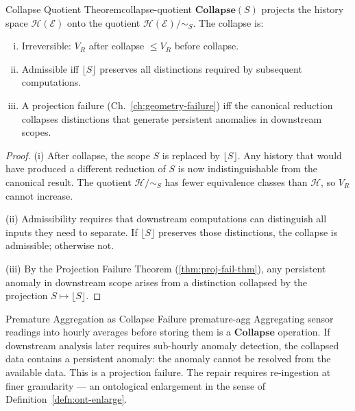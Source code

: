 \documentclass[12pt,twoside,openright]{book}
\newcommand{\csicon} {\marginpar{\tiny\color{DistBlue}\faCode}}
\newcommand{\hist}{\mathcal{H}}
\begin{document}
\begin{theorem}{Collapse Quotient Theorem}{collapse-quotient}
  $\mathbf{Collapse}(S)$ projects the history space
  $\hist(\mathcal{E})$ onto the quotient
  $\hist(\mathcal{E})/{\sim_S}$.
  The collapse is:
  \begin{enumerate}[(i)]
    \item Irreversible: $V_R$ after collapse
          $\le V_R$ before collapse.
    \item Admissible iff $\lfloor S \rfloor$ preserves
          all distinctions required by subsequent
          computations.
    \item A projection failure (Ch.~\ref{ch:geometry-failure})
          iff the canonical reduction collapses
          distinctions that generate persistent anomalies
          in downstream scopes.
  \end{enumerate}
\end{theorem}

\begin{proof}
  (i) After collapse, the scope $S$ is replaced by
  $\lfloor S \rfloor$. Any history that would have
  produced a different reduction of $S$ is now
  indistinguishable from the canonical result.
  The quotient $\hist/{\sim_S}$ has fewer equivalence
  classes than $\hist$, so $V_R$ cannot increase.

  (ii) Admissibility requires that downstream
  computations can distinguish all inputs they need to
  separate. If $\lfloor S \rfloor$ preserves those
  distinctions, the collapse is admissible; otherwise not.

  (iii) By the Projection Failure Theorem
  (\cref{thm:proj-fail-thm}), any persistent anomaly
  in downstream scope arises from a distinction collapsed
  by the projection $S \mapsto \lfloor S \rfloor$.
\end{proof}

\begin{example}{Premature Aggregation as Collapse Failure}%
  {premature-agg}
  \csicon
  Aggregating sensor readings into hourly averages before
  storing them is a $\mathbf{Collapse}$ operation. If
  downstream analysis later requires sub-hourly anomaly
  detection, the collapsed data contains a persistent
  anomaly: the anomaly cannot be resolved from the
  available data. This is a projection failure. The repair
  requires re-ingestion at finer granularity — an
  ontological enlargement in the sense of
  Definition~\ref{defn:ont-enlarge}.
\end{example}
\end{document}
